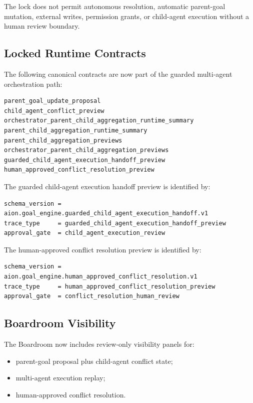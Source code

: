 The lock does not permit autonomous resolution, automatic parent-goal mutation, external writes, permission grants, or child-agent execution without a human review boundary.

\subsection{Locked Runtime Contracts}

The following canonical contracts are now part of the guarded multi-agent orchestration path:

\begin{verbatim}
parent_goal_update_proposal
child_agent_conflict_preview
orchestrator_parent_child_aggregation_runtime_summary
parent_child_aggregation_runtime_summary
parent_child_aggregation_previews
orchestrator_parent_child_aggregation_previews
guarded_child_agent_execution_handoff_preview
human_approved_conflict_resolution_preview
\end{verbatim}

The guarded child-agent execution handoff preview is identified by:

\begin{verbatim}
schema_version = aion.goal_engine.guarded_child_agent_execution_handoff.v1
trace_type     = guarded_child_agent_execution_handoff_preview
approval_gate  = child_agent_execution_review
\end{verbatim}

The human-approved conflict resolution preview is identified by:

\begin{verbatim}
schema_version = aion.goal_engine.human_approved_conflict_resolution.v1
trace_type     = human_approved_conflict_resolution_preview
approval_gate  = conflict_resolution_human_review
\end{verbatim}

\subsection{Boardroom Visibility}

The Boardroom now includes review-only visibility panels for:

\begin{itemize}
  \item parent-goal proposal plus child-agent conflict state;
  \item multi-agent execution replay;
  \item human-approved conflict resolution.
\end{itemize}

